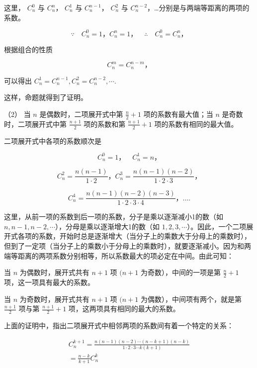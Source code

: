这里， \(C_{n}^{0}\) 与 \(C_{n}^{n}\)， \(C_{n}^{1}\) 与
\(C_{n}^{n-1}\)， \(C_{n}^{2}\) 与
\(C_{n}^{n-2}\)，\ldots 分别是与两端等距离的两项的系数。

\[
\because \quad C _ {n} ^ {0} = 1\text{，} C _ {n} ^ {n} = 1\text{，} \quad \therefore \quad C _ {n} ^ {0} = C _ {n} ^ {n}\text{，}
\]

根据组合的性质

\[
C _ {n} ^ {m} = C _ {n} ^ {n - m}\text{，}
\]

可以得出 \(C_{n}^{1}=C_{n}^{n-1}, C_{n}^{2}=C_{n}^{n-2}, \cdots.\)

这样，命题就得到了证明。

（2） 当 \(n\) 是偶数时，二项展开式中第 \(\frac{n}{2} + 1\)
项的系数有最大值；当 \(n\) 是奇数时，二项展开式中第 \(\frac{n + 1}{2}\)
项的系数和第 \(\frac{n + 1}{2} + 1\) 项的系数有相同的最大值。

 二项展开式中各项的系数顺次是

\[
C _ {n} ^ {0} = 1\text{，} \quad C _ {n} ^ {1} = n\text{，}
\]

\[
C _ {n} ^ {2} = \frac {n (n - 1)}{1 \cdot 2}\text{，} C _ {n} ^ {3} = \frac {n (n - 1) (n - 2)}{1 \cdot 2 \cdot 3}\text{，}
\]

\[
C _ {n} ^ {4} = \frac {n (n - 1) (n - 2) (n - 3)}{1 \cdot 2 \cdot 3 \cdot 4}\text{，} \dots .
\]

这里，从前一项的系数到后一项的系数，分子是乘以逐渐减小1的数（如
\(n, n-1, n-2, \cdots\)），分母是乘以逐渐增大1的数（如
\(1, 2, 3, \cdots\)）。因此，一个二项展开式各项的系数，开始时总是逐渐增大（当分子上的乘数大于分母上的乘数时），但到了一定项（当分子上的乘数小于分母上的乘数时），就要逐渐减小。因为和两端等距离的两项系数分别相等，所以系数最大的项必定在中间。由此可知：

当 \(n\) 为偶数时，展开式共有 \(n + 1\) 项 \((n + 1\)
为奇数），中间的一项是第 \(\frac{n}{2} + 1\) 项，这一项具有最大的系数。

当 \(n\) 为奇数时，展开式共有 \(n + 1\) 项 \((n + 1\)
为偶数），中间项有两个，就是第 \(\frac{n + 1}{2}\) 项与第
\(\frac{n + 1}{2} + 1\) 项，这两项具有相同的最大的系数。

上面的证明中，指出二项展开式中相邻两项的系数间有着一个特定的关系：

\[
\begin{array}{l} C _ {n} ^ {k + 1} = \frac {n (n - 1) (n - 2) \cdots (n - k + 1) (n - k)}{1 \cdot 2 \cdot 3 \cdots k (k + 1)} \\ = \frac {n - k}{k + 1} C _ {n} ^ {k} \\ \end{array}
\]

